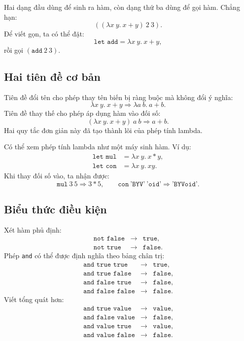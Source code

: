 \documentclass[11pt]{article}
\begin{document}
Hai dạng đầu dùng để sinh ra hàm, còn dạng thứ ba dùng để gọi hàm. Chẳng hạn:
\[
  ((\lambda x\ y.\ x+y)\ 2\ 3).
\]
Để viết gọn, ta có thể đặt:
\[
  \texttt{let add} = \lambda x\ y.\ x+y,
\]
rồi gọi \((\texttt{add}\ 2\ 3)\).

\subsection{Hai tiên đề cơ bản}

Tiên đề đổi tên cho phép thay tên biến bị ràng buộc mà không đổi ý nghĩa:
\[
  \lambda x\ y.\ x+y \Rightarrow \lambda a\ b.\ a+b.
\]
Tiên đề thay thế cho phép áp dụng hàm vào đối số:
\[
  (\lambda x\ y.\ x+y)\ a\ b \Rightarrow a+b.
\]
Hai quy tắc đơn giản này đã tạo thành lõi của phép tính lambda.

Có thể xem phép tính lambda như một máy sinh hàm. Ví dụ:
\[
\begin{aligned}
  \texttt{let mul} &= \lambda x\ y.\ x*y,\\
  \texttt{let con} &= \lambda x\ y.\ xy.
\end{aligned}
\]
Khi thay đối số vào, ta nhận được:
\[
  \texttt{mul}\ 3\ 5 \Rightarrow 3*5,\qquad
  \texttt{con}\ \texttt{'BYV'}\ \texttt{'oid'} \Rightarrow \texttt{'BYVoid'}.
\]

\subsection{Biểu thức điều kiện}

Xét hàm phủ định:
\[
\begin{array}{rcl}
\texttt{not false} &\rightarrow& \texttt{true},\\
\texttt{not true} &\rightarrow& \texttt{false}.
\end{array}
\]
Phép \texttt{and} có thể được định nghĩa theo bảng chân trị:
\[
\begin{array}{rcl}
\texttt{and true true} &\rightarrow& \texttt{true},\\
\texttt{and true false} &\rightarrow& \texttt{false},\\
\texttt{and false true} &\rightarrow& \texttt{false},\\
\texttt{and false false} &\rightarrow& \texttt{false}.
\end{array}
\]
Viết tổng quát hơn:
\[
\begin{array}{rcl}
\texttt{and true value} &\rightarrow& \texttt{value},\\
\texttt{and false value} &\rightarrow& \texttt{false},\\
\texttt{and value true} &\rightarrow& \texttt{value},\\
\texttt{and value false} &\rightarrow& \texttt{false}.
\end{array}
\]
\end{document}
